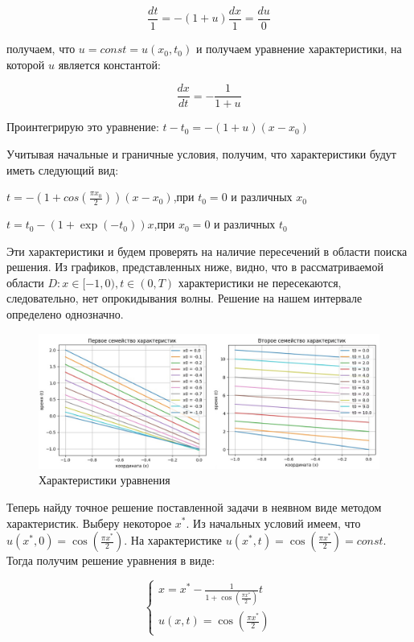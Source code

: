\documentclass[a4paper,14pt]{article}
\begin{document}
$$\frac{d t}{1}=-(1+u)\frac{d x}{1}=\frac{d u}{0}$$

\noindent получаем, что $u = const = u(x_0, t_0)$ и получаем уравнение характеристики, на которой $u$ является константой:

$$\frac{d x}{d t}=-\frac{1}{1+u}$$

\noindent Проинтегрирую это уравнение: $t-t_0 = -(1+u)(x-x_0)$

Учитывая начальные и граничные условия, получим, что характеристики будут иметь следующий вид:

$t = -(1+cos(\frac{\pi x_0}{2}))(x-x_0)$,\qquad при $t_0=0$ и различных $x_0$
\vspace{0.4 cm}

$t = t_0 - (1+\exp(-t_0))x$,\qquad при $x_0=0$ и различных $t_0$

\vspace{0.5 cm}
Эти характеристики и будем проверять на наличие пересечений в области поиска решения. Из графиков, представленных ниже, видно, что в рассматриваемой области $D: {x \in [−1,0), t \in (0, T)}$ характеристики не пересекаются, следовательно, нет опрокидывания волны. Решение на нашем интервале определено однозначно.


\begin{figure}[h!]
\centering
\includegraphics[scale=0.35]{характеристики.jpg}
\caption{\label{pic1}Характеристики уравнения}
\end{figure}

Теперь найду точное решение поставленной задачи в неявном виде методом характеристик. Выберу некоторое $x^*$. Из начальных условий имеем, что $u(x^*,0)=\cos(\frac{\pi x^*}{2})$. На характеристике $u(x^*,t)=\cos(\frac{\pi x^*}{2})=const$. Тогда получим решение уравнения в виде:

\begin{equation*}
\begin{cases}
   x = x^* - \frac{1}{1+\cos(\frac{\pi x^*}{2})}t\\
   u(x,t)=\cos(\frac{\pi x^*}{2})
 \end{cases}
\end{equation*}
\end{document}
